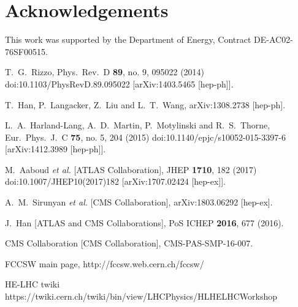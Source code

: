 \documentclass[14pt]{article}
\begin{document}
\section*{Acknowledgements}

%
This work was supported by the Department of Energy, Contract DE-AC02-76SF00515.




\begin{thebibliography}{99}


  T.~G.~Rizzo,
  Phys.\ Rev.\ D {\bf 89}, no. 9, 095022 (2014)
  doi:10.1103/PhysRevD.89.095022
  [arXiv:1403.5465 [hep-ph]].
  
  T.~Han, P.~Langacker, Z.~Liu and L.~T.~Wang,
  arXiv:1308.2738 [hep-ph].
 
  L.~A.~Harland-Lang, A.~D.~Martin, P.~Motylinski and R.~S.~Thorne,
  Eur.\ Phys.\ J.\ C {\bf 75}, no. 5, 204 (2015)
  doi:10.1140/epjc/s10052-015-3397-6
  [arXiv:1412.3989 [hep-ph]].
  

  M.~Aaboud {\it et al.} [ATLAS Collaboration],
  JHEP {\bf 1710}, 182 (2017)
  doi:10.1007/JHEP10(2017)182
  [arXiv:1707.02424 [hep-ex]].


  A.~M.~Sirunyan {\it et al.} [CMS Collaboration],
  arXiv:1803.06292 [hep-ex].


  J.~Han [ATLAS and CMS Collaborations],
  PoS ICHEP {\bf 2016}, 677 (2016).
 
  CMS Collaboration [CMS Collaboration],
  CMS-PAS-SMP-16-007.
  
 FCCSW main page, http://fccsw.web.cern.ch/fccsw/

 HE-LHC twiki https://twiki.cern.ch/twiki/bin/view/LHCPhysics/HLHELHCWorkshop

\end{thebibliography}

\end{document}
